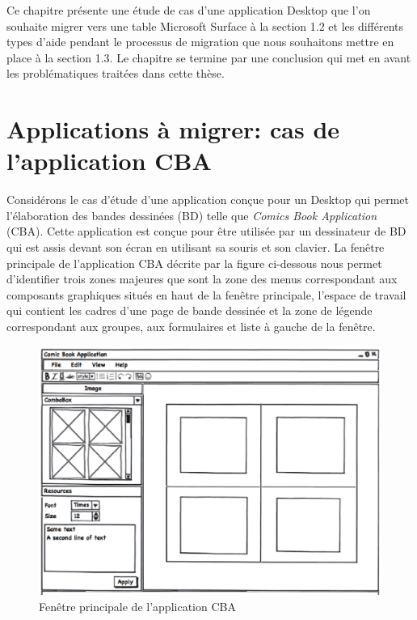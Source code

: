 Ce chapitre pr\'{e}sente une \'{e}tude de cas d'une application Desktop que l'on
souhaite migrer vers une table Microsoft Surface \`{a} la section 1.2 et les
diff\'{e}rents types d'aide pendant le processus de migration que nous souhaitons
mettre en place \`{a} la section 1.3. Le chapitre se termine par une conclusion
qui met en avant les probl\'{e}matiques trait\'{e}es dans cette th\`{e}se.

{\raggedright
\section{Applications \`{a} migrer: cas de l'application CBA}
}

Consid\'{e}rons le cas d'\'{e}tude d'une application con\c{c}ue pour un Desktop
qui permet l'\'{e}laboration des bandes dessin\'{e}es (BD) telle que
\textit{Comics Book Application }(CBA). Cette application est con\c{c}ue pour
\^{e}tre utilis\'{e}e par un dessinateur de BD qui est assis devant son \'{e}cran
en utilisant sa souris et son clavier. La fen\^{e}tre principale de l'application
CBA d\'{e}crite par la figure ci-dessous nous permet d'identifier trois zones
majeures que sont la zone des menus correspondant aux composants graphiques
situ\'{e}s en haut de la fen\^{e}tre principale, l'espace de travail qui contient
les cadres d'une page de bande dessin\'{e}e et la zone de l\'{e}gende
correspondant aux groupes, aux formulaires et liste \`{a} gauche de la
fen\^{e}tre.

\begin{figure}[h]
\begin{center}
\includegraphics[width=413pt]{chap1/img-1}
\caption{Fen\^{e}tre principale de l'application CBA}
\end{center}
\end{figure}


